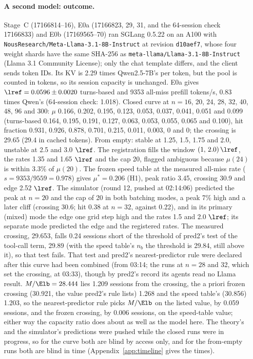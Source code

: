 \paragraph{A second model: outcome.} Stage~C (17166814--16), E0a (17166823, 29, 31, and the 64-session check 17166833) and E0b (17169565--70) ran SGLang 0.5.22 on an A100 with \texttt{NousResearch/Meta-Llama-3.1-8B-Instruct} at revision \texttt{d10aef7}, whose four weight shards have the same SHA-256 as \texttt{meta-llama/Llama-3.1-8B-Instruct} (Llama 3.1 Community License); only the chat template differs, and the client sends token IDs. Its KV is 2.29 times Qwen2.5-7B's per token, but the pool is counted in tokens, so its session capacity is unchanged. E0a gives $\lref=0.0596\pm0.0020$\sps{} turns-based and 9353 all-miss prefill tokens/s, 0.83 times Qwen's (64-session check: 1.018). Closed curve at $n=16$, 20, 24, 28, 32, 40, 48, 96 and 300: $\mu$ 0.166, 0.202, 0.195, 0.123, 0.053, 0.037, 0.041, 0.051 and 0.099\sps{} (turns-based 0.164, 0.195, 0.191, 0.127, 0.063, 0.053, 0.055, 0.065 and 0.100), hit fraction 0.931, 0.926, 0.878, 0.701, 0.215, 0.011, 0.003, 0 and 0; the crossing is 29.65 (29.4 in cached tokens). From empty: stable at 1.25, 1.5, 1.75 and 2.0, unstable at 2.5 and 3.0 $\lref$. The registration fills the window $(1,\,2.0)\,\lref$, the rates 1.35 and 1.65 $\lref$ and the cap 20, flagged ambiguous because $\mu(24)$ is within 3.3\% of $\mu(20)$. The frozen speed table at the measured all-miss rate ($s=9353/9559=0.978$) gives $\mu^*=0.206$ (H1), peak ratio 3.45, crossing 30.9 and edge 2.52 $\lref$. The simulator (round 12, pushed at 02:14:06) predicted the peak at $n=20$ and the cap of 20 in both batching modes, a peak 7\% high and a later cliff (crossing 30.6; hit 0.38 at $n=32$, against 0.22), and in its primary (mixed) mode the edge one grid step high and the rates 1.5 and 2.0 $\lref$; its separate mode predicted the edge and the registered rates. The measured crossing, 29.653, falls 0.24 sessions short of the threshold of pred2's test of the tool-call term, 29.89 (with the speed table's $n_b$ the threshold is 29.84, still above it), so that test fails. That test and pred2's nearest-predictor rule were declared after this curve had been combined (from 03:14; the runs at $n=28$ and 32, which set the crossing, at 03:33), though by pred2's record its agents read no Llama result. $M/\Elb=28.444$ lies 1.209 sessions from the crossing, the a priori frozen crossing (30.921, the value pred2's rule lists) 1.268 and the speed table's (30.856) 1.203, so the nearest-predictor rule picks $M/\Elb$ on the listed value, by 0.059 sessions, and the frozen crossing, by 0.006 sessions, on the speed-table value; either way the capacity ratio does about as well as the model here. The theory's and the simulator's predictions were pushed while the closed runs were in progress, so for the curve both are blind by access only, and for the from-empty runs both are blind in time (Appendix~\ref{app:timeline} gives the times).

